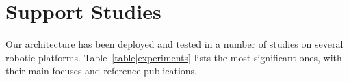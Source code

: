 \documentclass[preprint,3p,times]{elsarticle}
\begin{document}
%
%
%



\section{Support Studies}
\label{sec:expe}

Our architecture has been deployed and tested in a number of studies on
several robotic platforms. Table~\ref{table|experiments} lists the most
significant ones, with their main focuses and reference publications.
\end{document}

